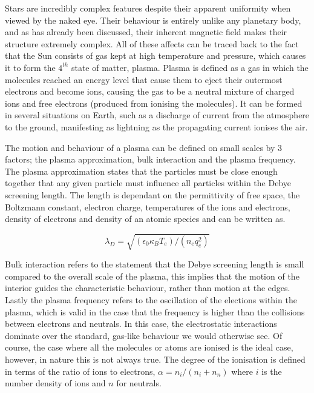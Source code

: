Stars are incredibly complex features despite their apparent uniformity when viewed by the naked eye.
Their behaviour is entirely unlike any planetary body, and as has already been discussed, their inherent magnetic field makes their structure extremely complex.
All of these affects can be traced back to the fact that the Sun consists of gas kept at high temperature and pressure, which causes it to form the $4^{th}$ state of matter, plasma.
Plasma is defined as a gas in which the molecules reached an energy level that cause them to eject their outermost electrons and become ions, causing the gas to be a neutral mixture of charged ions and free electrons (produced from ionising the molecules).
It can be formed in several situations on Earth, such as a discharge of current from the atmosphere to the ground, manifesting as lightning as the propagating current ionises the air.

The motion and behaviour of a plasma can be defined on small scales by 3 factors; the plasma approximation, bulk interaction and the plasma frequency.
The plasma approximation states that the particles must be close enough together that any given particle must influence all particles within the Debye screening length.
The length is dependant on the permittivity of free space, the Boltzmann constant, electron charge, temperatures of the ions and electrons, density of electrons and density of an atomic species and can be written as.

\begin{equation}
	\lambda_D = \sqrt{(\epsilon_0\kappa_BT_e)/(n_eq_e^2)}
\end{equation}

Bulk interaction refers to the statement that the Debye screening length is small compared to the overall scale of the plasma, this implies that the motion of the interior guides the characteristic behaviour, rather than motion at the edges.
Lastly the plasma frequency refers to the oscillation of the elections within the plasma, which is valid in the case that the frequency is higher than the collisions between electrons and neutrals.
In this case, the electrostatic interactions dominate over the standard, gas-like behaviour we would otherwise see.
Of course, the case where all the molecules or atoms are ionised is the ideal case, however, in nature this is not always true.
The degree of the ionisation is defined in terms of the ratio of ions to electrons, $\alpha = n_i/(n_i + n_n)$ where $i$ is the number density of ions and $n$ for neutrals.

